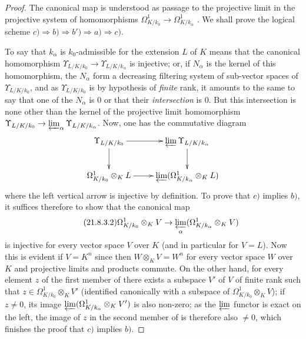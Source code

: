 \begin{proof}
The canonical map  is understood as passage to the projective limit in the projective system of homomorphisms $\Omega^1_{K/k_0}\to\Omega^1_{K/k_\alpha}$ .
We shall prove the logical scheme $c)\Rightarrow b)\Rightarrow b')\Rightarrow a)\Rightarrow c)$.

To say that $k_\alpha$ is $k_0$-admissible for the extension $L$ of $K$ means that the canonical homomorphism $\Upsilon_{L/K/k_0}\to\Upsilon_{L/K/k_\alpha}$ is injective; or, if $N_\alpha$ is the kernel of this homomorphism, the $N_\alpha$ form a decreasing filtering system of sub-vector spaces of $\Upsilon_{L/K/k_0}$, and as $\Upsilon_{L/K/k_0}$ is by hypothesis of \emph{finite} rank, it amounts to the same to say that one of the $N_\alpha$ is $0$ or that their \emph{intersection} is $0$.
But this intersection is none other than the kernel of the projective limit homomorphism $\Upsilon_{L/K/k_0}\to\varprojlim_\alpha\Upsilon_{L/K/k_\alpha}$.
Now, one has the commutative diagram
\[
  \xymatrix{
    \Upsilon_{L/K/k_0}\ar[r]\ar[d] & \varprojlim\Upsilon_{L/K/k_\alpha}\ar[d]\\
    \Omega^1_{K/k_0}\otimes_K L\ar[r] & \varprojlim(\Omega^1_{K/k_\alpha}\otimes_K L)
  }
\]
where the left vertical arrow is injective by definition.
To prove that $c)$ implies $b)$, it suffices therefore to show that the canonical map
\begin{equation}
\tag{21.8.3.2}
  \label{0.21.8.3.2}
  \Omega^1_{K/k_0}\otimes_K V\to\varprojlim_\alpha(\Omega^1_{K/k_\alpha}\otimes_K V)
\end{equation}
is injective for every vector space $V$ over $K$ (and in particular for $V=L$).
Now this is evident if $V=K^n$ since then $W\otimes_K V=W^n$ for every vector space $W$ over $K$ and projective limits and products commute.
On the other hand, for every element $z$ of the first member of  there exists a subspace $V'$ of $V$ of finite rank such that $z\in\Omega^1_{K/k_0}\otimes_K V'$ (identified canonically with a subspace of $\Omega^1_{K/k_0}\otimes_K V$); if $z\neq 0$, its image $\varprojlim(\Omega^1_{K/k_\alpha}\otimes_K V')$ is also non-zero; as the $\varprojlim$ functor is exact on the left, the image of $z$ in the second member of  is therefore also $\neq 0$, which finishes the proof that $c)$ implies $b)$.


\end{proof}
